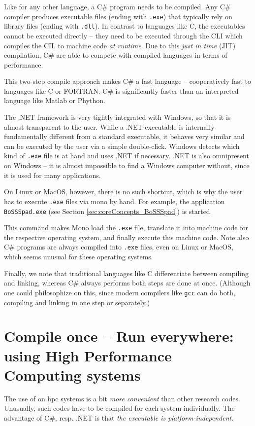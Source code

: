 \documentclass[a4paper,10pt]{report} %
\begin{document}
Like for any other language, a C\# program needs to be compiled. Any C\# compiler produces executable 
files (ending with \texttt{.exe}) that typically rely on library files (ending with \texttt{.dll}). 
In contrast to languages like C, the executables cannot be executed directly -- they need to be executed
 through the CLI which compiles the CIL to machine code \emph{at runtime}. Due to this \emph{just in time} (JIT) 
compilation, C\# are able to compete with compiled languages in terms of performance.

This two-step compile approach makes C\# a fast language -- cooperatively fast to 
languages like C or FORTRAN. C\# is significantly faster than an interpreted language like 
Matlab or Phython. 

The .NET framework is very tightly integrated with Windows, so that it is almost transparent to the user. 
While a .NET-executable is internally fundamentally different from a standard executable, it behaves very similar 
and can be executed by the user via a simple double-click. Windows detects which kind of \texttt{.exe} file is 
at hand and uses .NET if necessary. .NET is also omnipresent on Windows -- it is almost impossible to find a 
Windows computer without,
since it is used for many applications.

On Linux or MacOS, however, there is no such shortcut, which is why the user has to execute \texttt{.exe} 
files via mono by hand. For example, the \BoSSSpad{} application \texttt{BoSSSpad.exe} 
(see Section \ref{sec:coreConcepts_BoSSSpad}) is started


This command makes Mono load the \texttt{.exe} file, translate it into machine code for the respective 
operating system, and finally execute this machine code.
Note also C\# programs are always compiled into {\tt .exe} files, even on Linux or MacOS,
which seems unusual for these operating systems. 

Finally, we note that traditional languages like C differentiate between compiling and linking, whereas 
C\# always performs both steps are done at once.
(Although one could philosophize on this, since 
modern compilers like {\tt gcc} can do both, compiling and linking
in one step or separately.)


\section{Compile once -- Run everywhere: using High Performance Computing systems}
\label{sec:HPCuse}
The use of \BoSSS{} on \ac{hpc} systems is a bit \emph{more convenient} than other 
research codes.
Unusually, such codes have to be compiled for each system individually. 
The advantage of C\#, resp. .NET is that \emph{the executable is platform-independent}.
\end{document}
